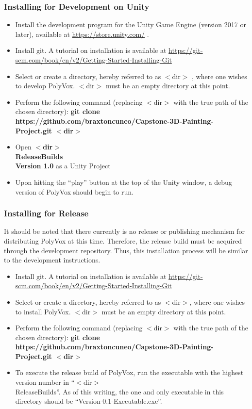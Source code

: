 \documentclass[onecolumn, draftclsnofoot,10pt, compsoc]{IEEEtran}
\begin{document}
\subsubsection{Installing for Development on Unity}
\begin{itemize}
\item Install the development program for the Unity Game Engine (version 2017 or later), available at \url{https://store.unity.com/} .
\item Install git. A tutorial on installation is available at \url{https://git-scm.com/book/en/v2/Getting-Started-Installing-Git}
\item Select or create a directory, hereby referred to as $<$dir$>$ , where one wishes to develop PolyVox. $<$dir$>$ must be an empty directory at this point.
\item Perform the following command (replacing $<$dir$>$ with the true path of the chosen directory): \textbf{git clone https://github.com/braxtoncuneo/Capstone-3D-Painting-Project.git $<$dir$>$}
\item Open \textbf{ $<$dir$>$ \\ReleaseBuilds\\Version 1.0} as a Unity Project
\item Upon hitting the “play” button at the top of the Unity window, a debug version of PolyVox should begin to run.
\end{itemize}

\subsubsection{Installing for Release}
It should be noted that there currently is no release or publishing mechanism for distributing PolyVox at this time. Therefore, the release build must be acquired through the development repository. Thus, this installation process will be similar to the development instructions.
\begin{itemize}
\item Install git. A tutorial on installation is available at \url{https://git-scm.com/book/en/v2/Getting-Started-Installing-Git}
\item Select or create a directory, hereby referred to as $<$dir$>$, where one wishes to install PolyVox. $<$dir$>$ must be an empty directory at this point.
\item Perform the following command (replacing $<$dir$>$ with the true path of the chosen directory): \textbf{git clone https://github.com/braxtoncuneo/Capstone-3D-Painting-Project.git $<$dir$>$}
\item To execute the release build of PolyVox, run the executable with the highest version number in “$<$dir$>$\\ReleaseBuilds”. As of this writing, the one and only executable in this directory should be “Version-0.1-Executable.exe”.
\end{itemize}
\end{document}
